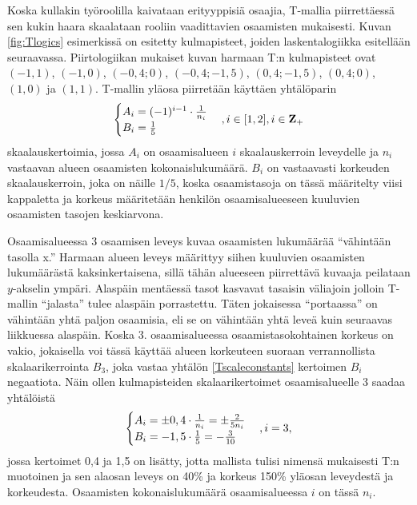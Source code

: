 \documentclass[a4paper,finnish,12pt]{article}
\begin{document}
Koska kullakin työroolilla kaivataan erityyppisiä osaajia, T-mallia piirrettäessä sen kukin haara skaalataan rooliin vaadittavien osaamisten mukaisesti. Kuvan \ref{fig:Tlogics} esimerkissä on esitetty kulmapisteet, joiden laskentalogiikka esitellään seuraavassa. Piirtologiikan mukaiset kuvan harmaan T:n kulmapisteet ovat $(-1, 1)$, $(-1, 0)$, $(-0,4; 0)$, $(-0,4; -1,5)$, $(0,4; -1,5)$, $(0,4; 0)$, $(1, 0)$ ja $(1, 1)$. T-mallin yläosa piirretään käyttäen yhtälöparin
\begin{equation}
\begin{cases}
A_i = (-1)^{i-1} \cdot \frac{1}{n_i} \\
B_i = \frac{1}{5} \\
\end{cases} \\ , i \in [1,2], i \in \mathbf{Z}_{+}
\label{Tscaleconstants}
\end{equation} skaalauskertoimia, jossa $A_i$ on osaamisalueen $i$ skaalauskerroin leveydelle ja $n_i$ vastaavan alueen osaamisten kokonaislukumäärä. $B_i$ on vastaavasti korkeuden skaalauskerroin, joka on näille $1/5$, koska osaamistasoja on tässä määritelty viisi kappaletta ja korkeus määritetään henkilön osaamisalueeseen kuuluvien osaamisten tasojen keskiarvona.

Osaamisalueessa 3 osaamisen leveys kuvaa osaamisten lukumäärää ``vähintään tasolla x.'' Harmaan alueen leveys määrittyy siihen kuuluvien osaamisten lukumäärästä kaksinkertaisena, sillä tähän alueeseen piirrettävä kuvaaja peilataan $y$-akselin ympäri. Alaspäin mentäessä tasot kasvavat tasaisin väliajoin jolloin T-mallin ``jalasta'' tulee alaspäin porrastettu. Täten jokaisessa ``portaassa'' on vähintään yhtä paljon osaamisia, eli se on vähintään yhtä leveä kuin seuraavas liikkuessa alaspäin. Koska 3. osaamisalueessa osaamistasokohtainen korkeus on vakio, jokaisella voi tässä käyttää alueen korkeuteen suoraan verrannollista skalaarikerrointa $B_3$, joka vastaa yhtälön \eqref{Tscaleconstants} kertoimen $B_i$ negaatiota. Näin ollen kulmapisteiden skalaarikertoimet osaamisalueelle 3 saadaa yhtälöistä
\begin{equation}
\begin{cases}
A_i = \pm 0,4 \cdot \frac{1}{n_i} = \pm \frac{2}{5 n_i} \\
B_i = - 1,5 \cdot \frac{1}{5} = - \frac{3}{10} \\
\end{cases} \\ , i = 3,
\label{Tscaleconstants3}
\end{equation} jossa kertoimet 0,4 ja 1,5 on lisätty, jotta mallista tulisi nimensä mukaisesti T:n muotoinen ja sen alaosan leveys on 40\% ja korkeus 150\% yläosan leveydestä ja korkeudesta. Osaamisten kokonaislukumäärä osaamisalueessa $i$ on tässä $n_i$.
\end{document}

